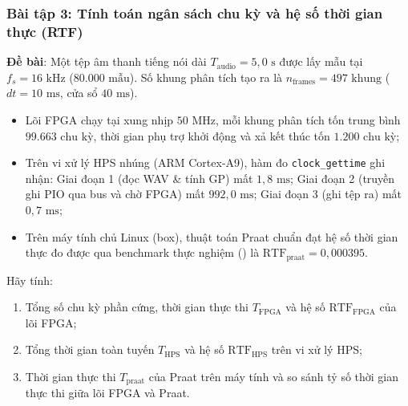 \subsubsection*{Bài tập 3: Tính toán ngân sách chu kỳ và hệ số thời gian thực (RTF)}
\textbf{Đề bài}: Một tệp âm thanh tiếng nói dài $T_{\text{audio}} = 5{,}0\text{ s}$ được lấy mẫu tại $f_s = 16\text{ kHz}$ ($80.000\text{ mẫu}$). Số khung phân tích tạo ra là $n_{\text{frames}} = 497\text{ khung}$ ($dt = 10\text{ ms}$, cửa sổ $40\text{ ms}$).
\begin{itemize}
    \item Lõi FPGA chạy tại xung nhịp $50\text{ MHz}$, mỗi khung phân tích tốn trung bình $99.663\text{ chu kỳ}$, thời gian phụ trợ khởi động và xả kết thúc tốn $1.200\text{ chu kỳ}$;
    \item Trên vi xử lý HPS nhúng (ARM Cortex-A9), hàm đo \texttt{clock\_gettime} ghi nhận: Giai đoạn 1 (đọc WAV \& tính GP) mất $1{,}8\text{ ms}$; Giai đoạn 2 (truyền ghi PIO qua bus và chờ FPGA) mất $992{,}0\text{ ms}$; Giai đoạn 3 (ghi tệp ra) mất $0{,}7\text{ ms}$;
    \item Trên máy tính chủ Linux (box), thuật toán Praat chuẩn đạt hệ số thời gian thực đo được qua benchmark thực nghiệm () là $\text{RTF}_{\text{praat}} = 0{,}000395$.
\end{itemize}
Hãy tính:
\begin{enumerate}[label=(\alph*)]
    \item Tổng số chu kỳ phần cứng, thời gian thực thi $T_{\text{FPGA}}$ và hệ số $\text{RTF}_{\text{FPGA}}$ của lõi FPGA;
    \item Tổng thời gian toàn tuyến $T_{\text{HPS}}$ và hệ số $\text{RTF}_{\text{HPS}}$ trên vi xử lý HPS;
    \item Thời gian thực thi $T_{\text{praat}}$ của Praat trên máy tính và so sánh tỷ số thời gian thực thi giữa lõi FPGA và Praat.
\end{enumerate}

